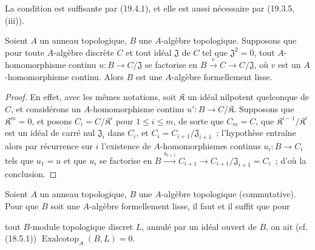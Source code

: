 La condition est suffisante par (19.4.1), et elle est aussi nécessaire par
(19.3.5, (iii)).

\begin{proposition}[19.4.3]
\label{0.19.4.3-fr}
Soient $A$ un anneau topologique, $B$ une $A$-algèbre topologique. Supposons
que pour toute $A$-algèbre discrète $C$ et tout idéal $\mathfrak J$ de $C$
tel que $\mathfrak J^2=0$, tout $A$-homomorphisme continu
$u:B\to C/\mathfrak J$ se factorise en
$B\xrightarrow{v}C\to C/\mathfrak J$, où $v$ est un $A$-homomorphisme
continu. Alors $B$ est une $A$-algèbre formellement lisse.
\end{proposition}

\begin{proof}
En effet, avec les mêmes notations, soit $\mathfrak K$ un idéal nilpotent
quelconque de $C$, et considérons un $A$-homomorphisme continu
$u':B\to C/\mathfrak K$. Supposons que $\mathfrak K^m=0$, et posons
$C_i=C/\mathfrak K^i$ pour $1\leq i\leq m$, de sorte que $C_m=C$, que
$\mathfrak K^{i-1}/\mathfrak K^i$ est un idéal de carré nul
$\mathfrak J_i$ dans $C_i$, et $C_i=C_{i+1}/\mathfrak J_{i+1}$~;
l'hypothèse entraîne alors par récurrence sur $i$ l'existence de
$A$-homomorphismes continus $u_i:B\to C_i$ tels que $u_1=u$ et que $u_i$
se factorise en
$B\xrightarrow{u_{i+1}}C_{i+1}\to C_{i+1}/\mathfrak J_{i+1}=C_i$~;
d'où la conclusion.
\end{proof}

\begin{proposition}[19.4.4]
\label{0.19.4.4-fr}
Soient $A$ un anneau topologique, $B$ une $A$-algèbre topologique
(commutative). Pour que $B$ soit une $A$-algèbre formellement lisse, il faut et
il suffit que pour


tout $B$-module topologique discret $L$, annulé par un idéal ouvert de $B$, on
ait \textup{(cf. (18.5.1))}
$\operatorname{Exalcotop}_A(B,L)=0$.
\end{proposition}

